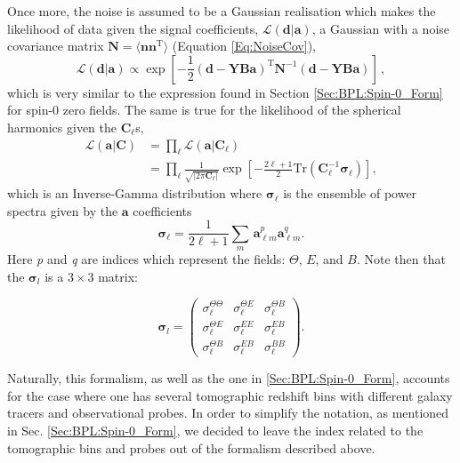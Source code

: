 \qquad Once more, the noise is assumed to be a Gaussian realisation which makes the likelihood of data given the signal coefficients, $\mathcal{L}(\mathbf{d}|\mathbf{a})$, a Gaussian with a noise covariance matrix $\mathbf{N}=\langle\mathbf{nn}^{\mathrm{T}} \rangle$ (Equation \ref{Eq:NoiseCov}),
\begin{equation}
\label{eqn::chCmbPol_Prda}
\mathcal{L}(\mathbf{d}|\mathbf{a}) \propto \exp \left[-\frac{1}{2}(\mathbf{d}-\mathbf{YBa})^{\mathrm{T}}\mathbf{N}^{-1}(\mathbf{d}-\mathbf{YBa}) \right]\, ,
\end{equation}
which is very similar to the expression found in Section \ref{Sec:BPL:Spin-0_Form} for spin-0 zero fields. The same is true for the likelihood of the spherical harmonics given the $\mathbf{C}_{\ell}$s,
\begin{align}
\mathcal{L}(\mathbf{a}|\mathbf{C}) & = \prod_{\ell} \mathcal{L}(\mathbf{a} | \mathbf{C}_{\ell}) \\ 
& = \prod_{\ell}\frac{1}{\sqrt{|2\pi\mathbf{C}_{\ell}|}}\exp\left[-\frac{2\ell+1}{2}\mathrm{Tr}(\mathbf{C}_{\ell}^{-1}\boldsymbol{\sigma}_{\ell})\right],
\end{align}
\noindent which is an Inverse-Gamma distribution where $\boldsymbol{\sigma}_{\ell}$ is the ensemble of power spectra given by the $\mathbf{a}$ coefficients
\begin{equation}
\boldsymbol{\sigma}_{\ell} = \frac{1}{2\ell+1}\sum_m\,\mathbf{a}^{p}_{\ell m}\mathbf{a}_{\ell m}^{q}.
\end{equation}
\noindent Here \textit{p} and \textit{q} are indices which represent the fields: $\Theta$, $E$, and $B$. Note then that the $\boldsymbol{\sigma}_l$ is a $3\times 3$ matrix:

\begin{equation}
\label{eqn::chCmbPol_defSigma_l}
\boldsymbol{\sigma}_l=\left(
\begin{array}{ccc}
\sigma_{\ell}^{\Theta\Theta} & \sigma_{\ell}^{\Theta E} & \sigma_{\ell}^{\Theta B} \\
\sigma_{\ell}^{\Theta E} & \sigma_{\ell}^{EE} & \sigma_{\ell}^{EB} \\
\sigma_{\ell}^{\Theta B} & \sigma_{\ell}^{EB} & \sigma_{\ell}^{BB}
\end{array} \right).
\end{equation}

\qquad Naturally, this formalism, as well as the one in \ref{Sec:BPL:Spin-0_Form}, accounts for the case where one has several tomographic redshift bins with different galaxy tracers and observational probes. In order to simplify the notation, as mentioned in Sec. \ref{Sec:BPL:Spin-0_Form}, we decided to leave the index related to the tomographic bins and probes out of the formalism described above.

